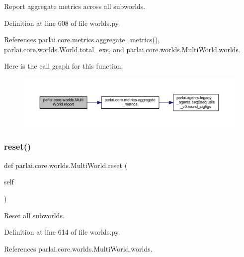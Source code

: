 \begin{DoxyVerb}Report aggregate metrics across all subworlds.\end{DoxyVerb}
 

Definition at line 608 of file worlds.\+py.



References parlai.\+core.\+metrics.\+aggregate\+\_\+metrics(), parlai.\+core.\+worlds.\+World.\+total\+\_\+exs, and parlai.\+core.\+worlds.\+Multi\+World.\+worlds.

Here is the call graph for this function\+:
\nopagebreak
\begin{figure}[H]
\begin{center}
\leavevmode
\includegraphics[width=350pt]{classparlai_1_1core_1_1worlds_1_1MultiWorld_aa89365baa3672e08d8e239199df4eda7_cgraph}
\end{center}
\end{figure}
\mbox{\label{classparlai_1_1core_1_1worlds_1_1MultiWorld_afcdadb92455ce41a8156390d876ebb96}} 
\subsubsection{\texorpdfstring{reset()}{reset()}}
{\footnotesize\ttfamily def parlai.\+core.\+worlds.\+Multi\+World.\+reset (\begin{DoxyParamCaption}\item[{}]{self }\end{DoxyParamCaption})}

\begin{DoxyVerb}Reset all subworlds.\end{DoxyVerb}
 

Definition at line 614 of file worlds.\+py.



References parlai.\+core.\+worlds.\+Multi\+World.\+worlds.

\mbox{\label{classparlai_1_1core_1_1worlds_1_1MultiWorld_a7d52dd60bfa5654bfc4ad656ccb07fa1}} 
